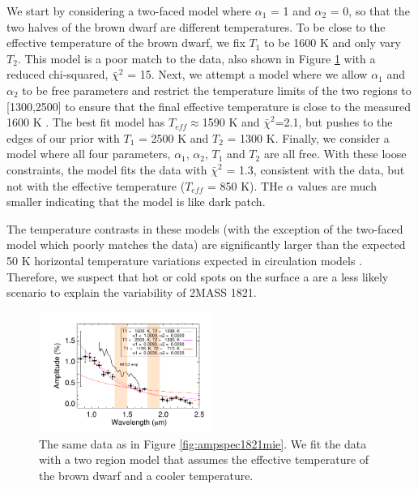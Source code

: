 \documentclass[twocolumn]{aastex6}
\begin{document}
We start by considering a two-faced model where $\alpha_1$ = 1 and $\alpha_2$ = 0, so that the two halves of the brown dwarf are different temperatures.
To be close to the effective temperature of the brown dwarf, we fix $T_1$ to be 1600 K and only vary $T_2$.
This model is a poor match to the data, also shown in Figure \ref{fig:ampspec1821tdiff} with a reduced chi-squared, $\bar{\chi}^2$ = 15.
Next, we attempt a model where we allow $\alpha_1$ and $\alpha_2$ to be free parameters and restrict the temperature limits of the two regions to [1300,2500] to ensure that the final effective temperature is close to the measured 1600 K \citep{gagne2015banyan7}.
The best fit model has $T_{eff} \approx $1590 K and $\bar{\chi}^2$=2.1, but pushes to the edges of our prior with $T_1$ = 2500 K and $T_2$ = 1300 K.
Finally, we consider a model where all four parameters, $\alpha_1$, $\alpha_2$, $T_1$ and $T_2$ are all free.
With these loose constraints, the model fits the data with $\bar{\chi}^2$ = 1.3, consistent with the data, but not with the effective temperature ($T_{eff}$ = 850 K).
THe $\alpha$ values are much smaller indicating that the model is like dark patch.

The temperature contrasts in these models (with the exception of the two-faced model which poorly matches the data) are significantly larger than the expected 50 K horizontal temperature variations expected in circulation models \citep{showman2013bdgpDynamics}.
Therefore, we suspect that hot or cold spots on the surface a are a less likely scenario to explain the variability of 2MASS 1821.

\begin{figure}
\begin{centering}
\includegraphics[width=0.5\textwidth]{amp_vs_wavl_j1821_t_diff.pdf}
\caption{The same data as in Figure \ref{fig:ampspec1821mie}. We fit the data with a two region model that assumes the effective temperature of the brown dwarf and a cooler temperature.}\label{fig:ampspec1821tdiff}
\end{centering}
\end{figure}
\end{document}
